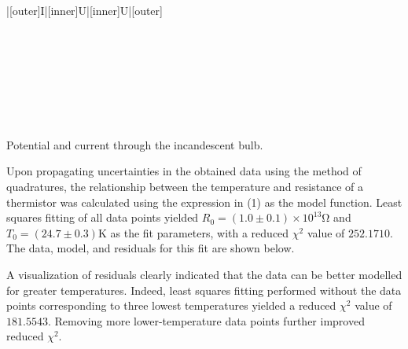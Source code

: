 \begin{paper}
{\begin{papertable}{|[outer]I|[inner]U|[inner]U|[outer]}
			\papertableindex{}\\\paperiline
			\papertableindex{}\\\paperiline
			\papertableindex{}\\\paperiline
			\papertableindex{}\\\paperiline
			\papertableindex{}\\\paperiline
			\papertableindex{}\\\paperiline
			\papertableindex{}\\\paperiline
			\papertableindex{}\\\paperoline
			\end{papertable}\vspace{-1.5em}}
	{Potential and current through the incandescent bulb.} %

	
	Upon propagating uncertainties in the obtained data using the method of quadratures, the relationship between the temperature and resistance of a thermistor was calculated using the expression in (1) as the model function. Least squares fitting of all data points yielded \( R_0 = (1.0 \pm 0.1) \times 10^{13} \si{\ohm} \) and \( T_0 = (24.7 \pm 0.3) \si{\kelvin} \) as the fit parameters, with a reduced \( \chi ^ 2 \) value of \( 252.1710 \). The data, model, and residuals for this fit are shown below.
	
	 \vspace{1em}

	A visualization of residuals clearly indicated that the data can be better modelled for greater temperatures. Indeed, least squares fitting performed without the data points corresponding to three lowest temperatures yielded a reduced \( \chi ^ 2 \) value of \( 181.5543 \). Removing more lower-temperature data points further improved reduced \( \chi ^ 2 \). %
	

\end{paper}
